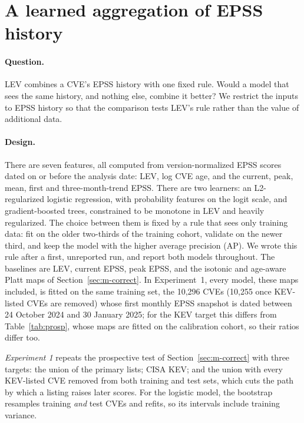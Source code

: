 \section{A learned aggregation of EPSS history}\label{app:learned}

\paragraph{Question.} LEV combines a CVE's EPSS history with one fixed rule.
Would a model that sees the same history, and nothing else, combine it better?
We restrict the inputs to EPSS history so that the comparison tests LEV's rule
rather than the value of additional data.

\paragraph{Design.} There are seven features, all computed from
version-normalized EPSS scores dated on or before the analysis date: LEV, log
CVE age, and the current, peak, mean, first and three-month-trend EPSS. There
are two learners: an L2-regularized logistic regression, with probability
features on the logit scale, and gradient-boosted trees, constrained to be
monotone in LEV and heavily regularized. The choice between them is fixed by a
rule that sees only training data: fit on the older two-thirds of the training
cohort, validate on the newer third, and keep the model with the higher average
precision (AP). We wrote this rule after a first, unreported run, and report
both models throughout. The baselines are LEV, current EPSS, peak EPSS, and the
isotonic and age-aware Platt maps of Section~\ref{sec:m-correct}. In Experiment~1, every
model, these maps included, is fitted on the same training set, the 10,296 CVEs
(10,255 once KEV-listed CVEs are removed) whose
first monthly EPSS snapshot is dated between 24 October 2024 and
30 January 2025; for the KEV target this
differs from Table~\ref{tab:prosp}, whose maps are fitted on the calibration
cohort, so their ratios differ too.

\emph{Experiment 1} repeats the prospective test of
Section~\ref{sec:m-correct} with three targets: the union of the primary lists;
CISA KEV; and the union with every KEV-listed CVE removed from both training
and test sets, which cuts the path by which a listing raises later scores. For
the logistic model, the bootstrap resamples training \emph{and} test CVEs and
refits, so its intervals include training variance.

